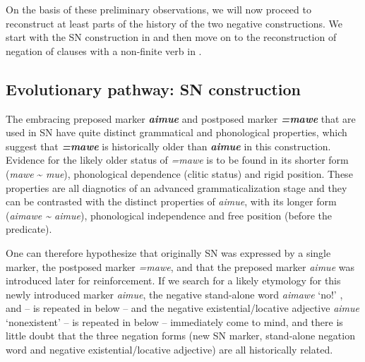 \documentclass[output=paper,draft,draftmode,colorlinks,citecolor=brown]{langscibook}
\begin{document}
On the basis of these preliminary observations, we will now proceed to
reconstruct at least parts of the history of the two negative
constructions. We start with the SN construction in
 and then move on to the reconstruction of
negation of clauses with a non-finite verb in .

\subsection{Evolutionary pathway: SN construction}\label{sec:tacana-10.1}

The embracing preposed marker \textbf{\textit{aimue}} and postposed marker
\textbf{\textit{=mawe}} that are used in SN have quite distinct grammatical
and phonological properties, which suggest that \textbf{\textit{=mawe}} is historically older than \textbf{\textit{aimue}} in this construction. Evidence for the likely older status of \textit{=mawe} is to be found in its shorter form (\textit{mawe} {\textasciitilde} \textit{mue}), phonological dependence (clitic status) and rigid position. These properties are all diagnotics of an advanced grammaticalization stage and they can be contrasted with the distinct properties of \textit{aimue}, with its longer form (\textit{aimawe {\textasciitilde} aimue}), phonological independence and free position (before the predicate).

One can therefore hypothesize that originally SN was expressed by a
single marker, the postposed marker \textit{=mawe}, and that the preposed
marker \textit{aimue} was introduced later for reinforcement. If we search
for a likely etymology for this newly introduced marker \textit{aimue}, the
negative stand-alone word \textit{aimawe} `no!'
,  and
 --  is repeated in
 below -- and the negative
existential\slash locative adjective \textit{aimue} `nonexistent'
 --  is repeated in
 below – immediately come to mind, and there is little doubt that the three negation forms (new SN marker, stand-alone negation word and negative existential\slash locative adjective) are all historically related.
\end{document}
